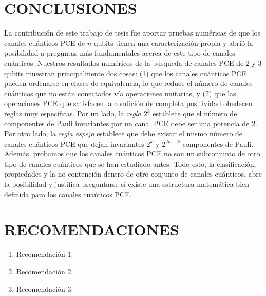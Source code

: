 

\chapter{CONCLUSIONES}
La contribución de este trabajo de tesis fue aportar pruebas numéricas
de que los canales cuánticos PCE de $n$ qubits tienen una caracterización propia 
y abrió la posibilidad a preguntas más fundamentales acerca de este 
tipo de canales cuánticos.
Nuestros resultados numéricos de la búsqueda de canales PCE de 2 y 3 qubits 
muestran principalmente dos cosas: (1) que los canales cuánticos PCE pueden 
ordenarse en clases de equivalencia, lo que reduce el número de canales cuánticos
que no están conectados vía operaciones unitarias, y (2) que las operaciones PCE que satisfacen la condición 
de completa positividad obedecen reglas muy específicas. Por un lado, 
la \textit{regla $2^k$} establece que el número de 
componentes de Pauli invariantes por un canal PCE debe ser una potencia de 2. 
Por otro lado, la \textit{regla espejo} establece que debe existir el mismo número de 
canales cuánticos PCE que dejan invariantes $2^k$ y $2^{2n-k}$ componentes 
de Pauli. Además, probamos que los canales cuánticos PCE no son un subconjunto
de otro tipo de canales cuánticos que se han estudiado antes. Todo esto, la clasificación,
propiedades y la no contención dentro de otro conjunto de canales cuánticos, 
abre la posibilidad y justifica preguntarse si existe una estructura matemática bien 
definida para los canales cuańticos PCE.

\chapter{RECOMENDACIONES}
\begin{enumerate}
	\item Recomendación 1.
	\item Recomendación 2.
	\item Recomendación 3.
\end{enumerate}
